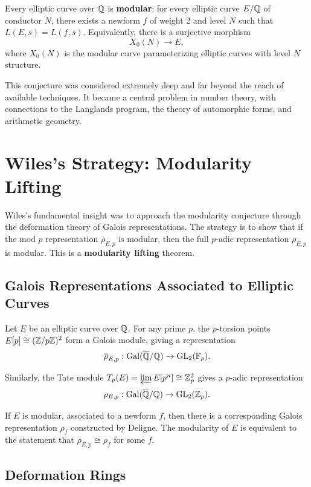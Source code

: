 \begin{condition}
Every elliptic curve over \(\mathbb{Q}\) is \textbf{modular}: for every elliptic curve \(E/\mathbb{Q}\) of conductor \(N\), there exists a newform \(f\) of weight 2 and level \(N\) such that \(L(E,s) = L(f,s)\). Equivalently, there is a surjective morphism
\[
X_0(N) \to E,
\]
where \(X_0(N)\) is the modular curve parameterizing elliptic curves with level \(N\) structure.
\end{condition}

This conjecture was considered extremely deep and far beyond the reach of available techniques. It became a central problem in number theory, with connections to the Langlands program, the theory of automorphic forms, and arithmetic geometry.

\section{Wiles's Strategy: Modularity Lifting}

Wiles's fundamental insight was to approach the modularity conjecture through the deformation theory of Galois representations. The strategy is to show that if the mod \(p\) representation \(\overline{\rho}_{E,p}\) is modular, then the full \(p\)-adic representation \(\rho_{E,p}\) is modular. This is a \textbf{modularity lifting} theorem.

\subsection{Galois Representations Associated to Elliptic Curves}

Let \(E\) be an elliptic curve over \(\mathbb{Q}\). For any prime \(p\), the \(p\)-torsion points \(E[p] \cong (\mathbb{Z}/p\mathbb{Z})^2\) form a Galois module, giving a representation
\[
\overline{\rho}_{E,p}: \operatorname{Gal}(\overline{\mathbb{Q}}/\mathbb{Q}) \to \operatorname{GL}_2(\mathbb{F}_p).
\]

Similarly, the Tate module \(T_p(E) = \varprojlim E[p^n] \cong \mathbb{Z}_p^2\) gives a \(p\)-adic representation
\[
\rho_{E,p}: \operatorname{Gal}(\overline{\mathbb{Q}}/\mathbb{Q}) \to \operatorname{GL}_2(\mathbb{Z}_p).
\]

If \(E\) is modular, associated to a newform \(f\), then there is a corresponding Galois representation \(\rho_f\) constructed by Deligne. The modularity of \(E\) is equivalent to the statement that \(\rho_{E,p} \cong \rho_f\) for some \(f\).

\subsection{Deformation Rings}

